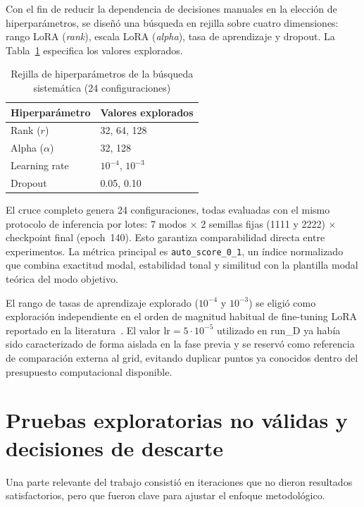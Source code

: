 \documentclass[%
    school=etsisi,%
    type=pfg,%
    degree=61CD,%
]{upm-report}
\begin{document}
Con el fin de reducir la dependencia de decisiones manuales en la elecci\'on de hiperpar\'ametros, se dise\~n\'o una b\'usqueda en rejilla sobre cuatro dimensiones: rango LoRA (\textit{rank}), escala LoRA (\textit{alpha}), tasa de aprendizaje y dropout. La Tabla~\ref{tab:stage1-grid} especifica los valores explorados.

\begin{table}[H]
    \centering
    \caption{Rejilla de hiperpar\'ametros de la b\'usqueda sistem\'atica (24 configuraciones)}
    \label{tab:stage1-grid}
    \begin{tabular}{ll}
        \toprule
        \textbf{Hiperpar\'ametro} & \textbf{Valores explorados} \\
        \midrule
        Rank ($r$)      & 32, 64, 128 \\
        Alpha ($\alpha$) & 32, 128 \\
        Learning rate   & $10^{-4}$, $10^{-3}$ \\
        Dropout         & 0.05, 0.10 \\
        \bottomrule
    \end{tabular}
\end{table}

El cruce completo genera 24 configuraciones, todas evaluadas con el mismo protocolo de inferencia por lotes: 7 modos $\times$ 2 semillas fijas (1111 y 2222) $\times$ checkpoint final (epoch~140). Esto garantiza comparabilidad directa entre experimentos. La m\'etrica principal es \texttt{auto\_score\_0\_1}, un \'indice normalizado que combina exactitud modal, estabilidad tonal y similitud con la plantilla modal te\'orica del modo objetivo.

El rango de tasas de aprendizaje explorado ($10^{-4}$ y $10^{-3}$) se eligi\'o como exploraci\'on independiente en el orden de magnitud habitual de fine-tuning LoRA reportado en la literatura~\cite{hu2022lora,ding2023peft}. El valor $\text{lr} = 5 \cdot 10^{-5}$ utilizado en run\_D ya hab\'ia sido caracterizado de forma aislada en la fase previa y se reserv\'o como referencia de comparaci\'on externa al grid, evitando duplicar puntos ya conocidos dentro del presupuesto computacional disponible.

\section{Pruebas exploratorias no v\'alidas y decisiones de descarte}

Una parte relevante del trabajo consisti\'o en iteraciones que no dieron resultados satisfactorios, pero que fueron clave para ajustar el enfoque metodol\'ogico.
\end{document}
